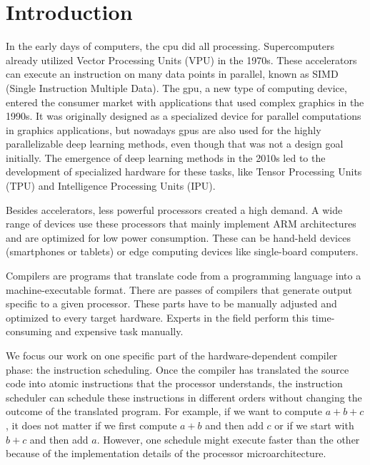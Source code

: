 \chapter{Introduction}
In the early days of computers, the \ac{cpu} did all processing.
Supercomputers already utilized Vector Processing Units (VPU) in the 1970s.
These accelerators can execute an instruction on many data points in parallel, known as SIMD (Single Instruction Multiple Data).
The \ac{gpu}, a new type of computing device, entered the consumer market with applications that used complex graphics in the 1990s.
It was originally designed as a specialized device for parallel computations in graphics applications, but nowadays \acp{gpu} are also used for the highly parallelizable deep learning methods, even though that was not a design goal initially.
The emergence of deep learning methods in the 2010s led to the development of specialized hardware for these tasks, like Tensor Processing Units (TPU) and Intelligence Processing Units (IPU).

Besides accelerators, less powerful processors created a high demand.
A wide range of devices use these processors that mainly implement ARM architectures and are optimized for low power consumption.
These can be hand-held devices (\eg smartphones or tablets) or edge computing devices like single-board computers.

Compilers are programs that translate code from a programming language into a machine-executable format.
There are passes of compilers that generate output specific to a given processor.
These parts have to be manually adjusted and optimized to every target hardware.
Experts in the field perform this time-consuming and expensive task manually.

We focus our work on one specific part of the hardware-dependent compiler phase: the instruction scheduling.
Once the compiler has translated the source code into atomic instructions that the processor understands, the instruction scheduler can schedule these instructions in different orders without changing the outcome of the translated program.
For example, if we want to compute $a+b+c$, it does not matter if we first compute $a+b$ and then add $c$ or if we start with $b+c$ and then add $a$.
However, one schedule might execute faster than the other because of the implementation details of the processor microarchitecture.

